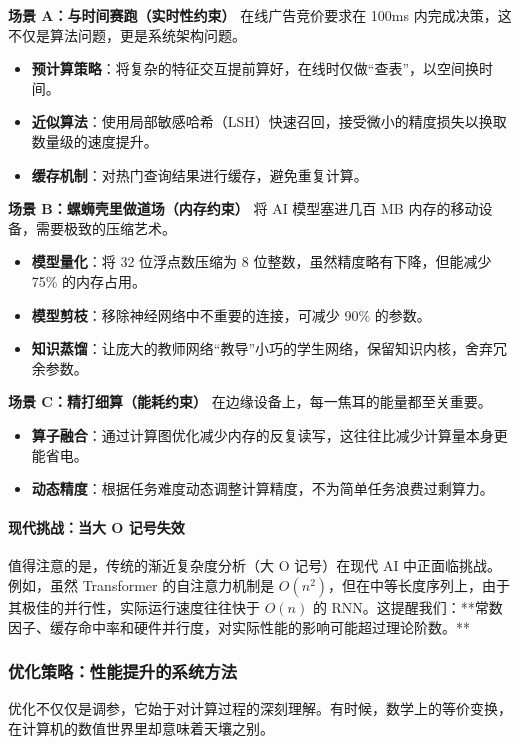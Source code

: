 \textbf{场景 A：与时间赛跑（实时性约束）}
在线广告竞价要求在 100ms 内完成决策，这不仅是算法问题，更是系统架构问题。
\begin{itemize}
    \item \textbf{预计算策略}：将复杂的特征交互提前算好，在线时仅做“查表”，以空间换时间。
    \item \textbf{近似算法}：使用局部敏感哈希（LSH）快速召回，接受微小的精度损失以换取数量级的速度提升。
    \item \textbf{缓存机制}：对热门查询结果进行缓存，避免重复计算。
\end{itemize}

\textbf{场景 B：螺蛳壳里做道场（内存约束）}
将 AI 模型塞进几百 MB 内存的移动设备，需要极致的压缩艺术。
\begin{itemize}
    \item \textbf{模型量化}：将 32 位浮点数压缩为 8 位整数，虽然精度略有下降，但能减少 75\% 的内存占用。
    \item \textbf{模型剪枝}：移除神经网络中不重要的连接，可减少 90\% 的参数。
    \item \textbf{知识蒸馏}：让庞大的教师网络“教导”小巧的学生网络，保留知识内核，舍弃冗余参数。
\end{itemize}

\textbf{场景 C：精打细算（能耗约束）}
在边缘设备上，每一焦耳的能量都至关重要。
\begin{itemize}
    \item \textbf{算子融合}：通过计算图优化减少内存的反复读写，这往往比减少计算量本身更能省电。
    \item \textbf{动态精度}：根据任务难度动态调整计算精度，不为简单任务浪费过剩算力。
\end{itemize}

\paragraph{现代挑战：当大 O 记号失效}
值得注意的是，传统的渐近复杂度分析（大 O 记号）在现代 AI 中正面临挑战。例如，虽然 Transformer 的自注意力机制是 $O(n^2)$，但在中等长度序列上，由于其极佳的并行性，实际运行速度往往快于 $O(n)$ 的 RNN。这提醒我们：**常数因子、缓存命中率和硬件并行度，对实际性能的影响可能超过理论阶数。**

\subsubsection{优化策略：性能提升的系统方法}

优化不仅仅是调参，它始于对计算过程的深刻理解。有时候，数学上的等价变换，在计算机的数值世界里却意味着天壤之别。

